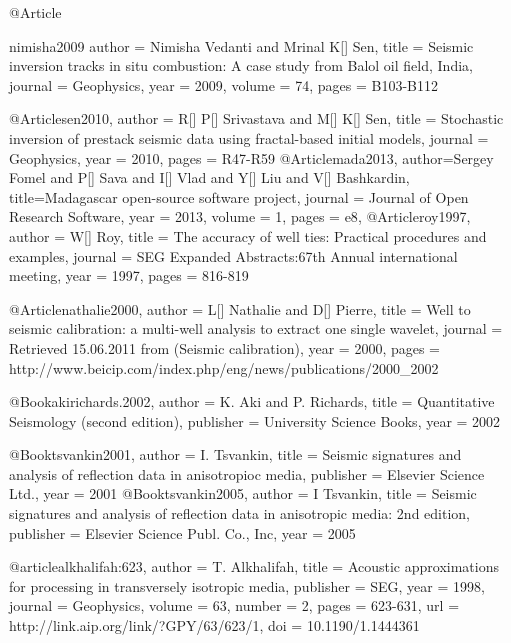 @Article{nimisha2009
  author = 	 {Nimisha Vedanti and Mrinal K[] Sen},
  title = 	 {Seismic inversion tracks in situ combustion: A case study from Balol oil field, India,
  journal = 	 {Geophysics},
  year = 	 2009,
  volume = 	 74,
  pages = 	 {B103-B112}}
	


@Article{sen2010,
  author = 	 {R[] P[] Srivastava and M[] K[] Sen},
  title = 	 {Stochastic inversion of prestack seismic data using fractal-based initial models},
  journal = 	 {Geophysics},
  year = 	 2010,
  pages =	 {R47-R59}
}
@Article{mada2013,
  author={Sergey Fomel and P[] Sava and I[] Vlad and Y[] Liu and V[] Bashkardin},
  title={Madagascar open-source software project},
  journal = 	 {Journal of Open Research Software},
  year = 	 2013,
  volume =	 1,
  pages =	 {e8},
}
@Article{roy1997,
  author = 	 {W[] Roy},
  title = 	 {The accuracy of well ties: Practical procedures and examples},
  journal = 	 {SEG Expanded Abstracts:67th Annual international meeting},
  year = 	 1997,
  pages =	 {816-819}
}

@Article{nathalie2000,
  author = 	 {L[] Nathalie and D[] Pierre},
  title = 	 {Well to seismic calibration: a multi-well analysis to extract one single wavelet},
  journal = 	 {Retrieved 15.06.2011 from (Seismic calibration)},
  year = 	 2000,
  pages =	 {http://www.beicip.com/index.php/eng/news/publications/2000\_2002}
}


  
@Book{akirichards.2002,
  author =	 {K. Aki and P. Richards},
  title =	 {Quantitative Seismology (second edition)},
  publisher =	 {University Science Books},
  year =	 2002
}

@Book{tsvankin2001,
  author =	 {I. Tsvankin},
  title =	 {Seismic signatures and analysis of reflection data
                  in anisotropioc media},
  publisher =	 {Elsevier Science Ltd.},
  year =	 2001
}
@Book{tsvankin2005,
  author =	 {I Tsvankin},
  title =	 {Seismic signatures and analysis of reflection data
                  in anisotropic media: 2nd edition},
  publisher =	 {Elsevier Science Publ. Co., Inc},
  year =	 2005
}

@article{alkhalifah:623,
  author =	 {T. Alkhalifah},
  title =	 {Acoustic approximations for processing in
                  transversely isotropic media},
  publisher =	 {SEG},
  year =	 1998,
  journal =	 {Geophysics},
  volume =	 63,
  number =	 2,
  pages =	 {623-631},
  url =		 {http://link.aip.org/link/?GPY/63/623/1},
  doi =		 {10.1190/1.1444361}
}

}
